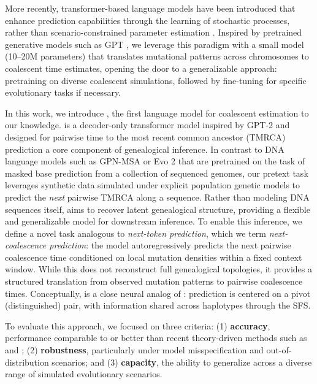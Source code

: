 \documentclass[9pt,twocolumn,twoside]{pnas-new}
\begin{document}
More recently, transformer-based language models have been introduced
that enhance prediction capabilities through the learning of stochastic processes,
rather than scenario-constrained parameter estimation \cite{nait_saada_inference_2023}.
Inspired by pretrained generative models such as GPT \cite{Radford2018ImprovingLU},
we leverage this paradigm with a small model (10--20M parameters) that translates
mutational patterns across chromosomes to coalescent time estimates,
opening the door to a generalizable approach: pretraining on diverse coalescent simulations,
followed by fine-tuning for specific evolutionary tasks if necessary.

In this work, we introduce \cxtkit, the first language model for coalescent estimation to our knowledge. \cxtkit is a decoder-only transformer model inspired by GPT-2 and designed for pairwise time to the most recent common ancestor (TMRCA) prediction \textemdash a core component of genealogical inference. 
In contrast to DNA language models such as GPN-MSA or Evo 2  \cite{benegas2025dna, brixi2025genome} 
that are pretrained on the task of masked base prediction from a collection of sequenced genomes, 
our pretext task leverages synthetic data simulated under explicit population genetic models to predict the \emph{next} pairwise TMRCA along a sequence. 
Rather than modeling DNA sequences itself, \cxtkit aims to recover latent genealogical structure, providing a flexible and generalizable model for downstream inference. 
To enable this inference, we define a novel task analogous to \textit{next-token prediction},
which we term \textit{next-coalescence prediction}: the model autoregressively predicts
the next pairwise coalescence time conditioned on local mutation densities within a fixed
context window. While this does not reconstruct full genealogical topologies, it provides
a structured translation from observed mutation patterns to pairwise coalescence times.
Conceptually, \cxtkit is a close neural analog of \smcpp: prediction is centered on a
pivot (distinguished) pair, with information shared across haplotypes through the SFS.

To evaluate this approach, we focused on three criteria:
(1) \textbf{accuracy}, performance comparable to or better than recent theory-driven methods such as \singer and \smcpp;
(2) \textbf{robustness}, particularly under model misspecification and out-of-distribution scenarios; and
(3) \textbf{capacity}, the ability to generalize across a diverse range of simulated evolutionary scenarios.
\end{document}
